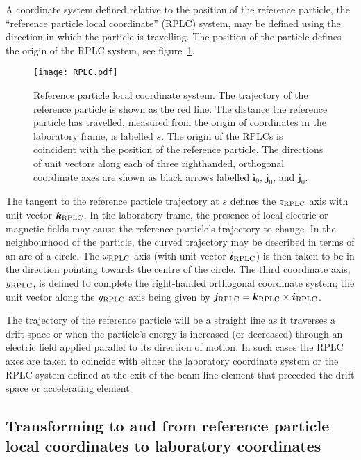 A coordinate system defined relative to the position of the reference
particle, the ``reference particle local coordinate'' (RPLC) system,
may be defined using the direction in which the particle is
travelling. 
The position of the particle defines the origin of the RPLC system,
see figure~\ref{fig:RPLC}.
\begin{figure}
  \begin{center}
    \texttt{[image: RPLC.pdf]}
  \end{center}
  \caption{
    Reference particle local coordinate system.
    The trajectory of the reference particle is shown as the red line.
    The distance the reference particle has travelled, measured from
    the origin of coordinates in the laboratory frame, is labelled
    $s$.
    The origin of the RPLCs is coincident with the position of the
    reference particle.
    The directions of unit vectors along each of three righthanded,
    orthogonal coordinate axes are shown as black arrows labelled
    $\bm{i}_0$, $\bm{j}_0$, and $\bm{j}_0$. 
  }
  \label{fig:RPLC}
\end{figure}

The tangent to the reference particle trajectory at $s$ defines the
$z_{\rm RPLC}$ axis with unit vector $\bm{k}_{\rm RPLC}$.
In the laboratory frame, the presence of local electric or magnetic
fields may cause the reference particle's trajectory to change.
In the neighbourhood of the particle, the curved trajectory may be
described in terms of an arc of a circle.
The $x_{\rm RPLC}$ axis (with unit vector $\bm{i}_{\rm RPLC}$) is then
taken to be in the direction pointing towards the centre of the
circle. 
The third coordinate axis, $y_{\rm RPLC}$, is defined to complete the
right-handed orthogonal coordinate system; the unit vector along the
$y_{\rm RPLC}$ axis being given by
$\bm{j}_{\rm RPLC} = \bm{k}_{\rm RPLC} \times \bm{i}_{\rm RPLC}$.

The trajectory of the reference particle will be a straight line as it
traverses a drift space or when the particle's energy is increased (or
decreased) through an electric field applied parallel to its direction
of motion.
In such cases the RPLC axes are taken to coincide with either the
laboratory coordinate system or the RPLC system defined at the exit of
the beam-line element that preceded the drift space or accelerating
element.

\subsection{Transforming to and from reference particle local
            coordinates to laboratory coordinates}
            
